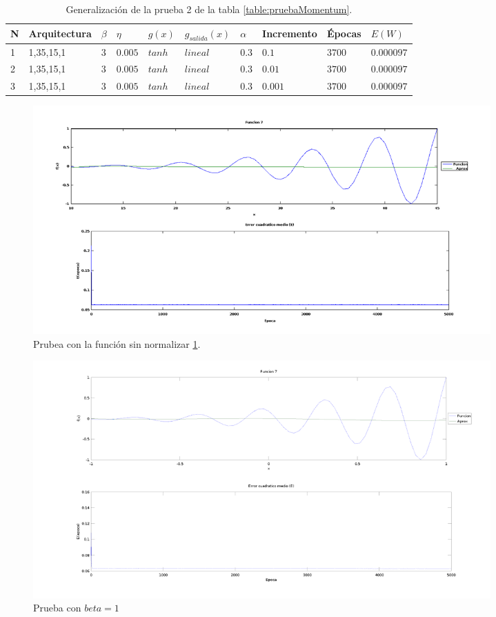 \documentclass[11pt,a4paper]{article}
\begin{document}
{\begin{table}[ht]
\centering
\begin{tabular}{|l|l|l|l|l|l|l|l|l|l|}
\hline
N & Arquitectura & $\beta$ & $\eta$ & $g(x)$ & $g_{salida}(x)$ & $\alpha$ & Incremento & Épocas & $E(W)$ \\ \hline
1 & 1,35,15,1    & $3$    & $0.005$ & $tanh$ & $lineal$      & $0.3$   & $0.1$       & $3700$   & $0.000097$ \\ \hline
2 & 1,35,15,1    & $3$    & $0.005$ & $tanh$ & $lineal$      & $0.3$   & $0.01$       & $3700$   & $0.000097$ \\ \hline
3 & 1,35,15,1    & $3$    & $0.005$ & $tanh$ & $lineal$      & $0.3$   & $0.001$      & $3700$   & $0.000097$ \\ \hline
\end{tabular}
\caption{Generalización de la prueba 2 de la tabla \ref{table:pruebaMomentum}.}
\label{table:gen}
\end{table}

\begin{figure}[ht]
\centering
\includegraphics[width=0.85\textwidth]{img/sinNormalizar.png}
\caption{\label{fig:sinNormalizar} Prubea con la función sin normalizar \ref{table:gen}.}
\end{figure}

\begin{figure}[ht]
\centering
\includegraphics[width=0.85\textwidth]{img/PruebaRecu11.png}
\caption{\label{fig:PruebaRecu11} Prueba con $beta = 1$}
\end{figure}

}
\end{document}
